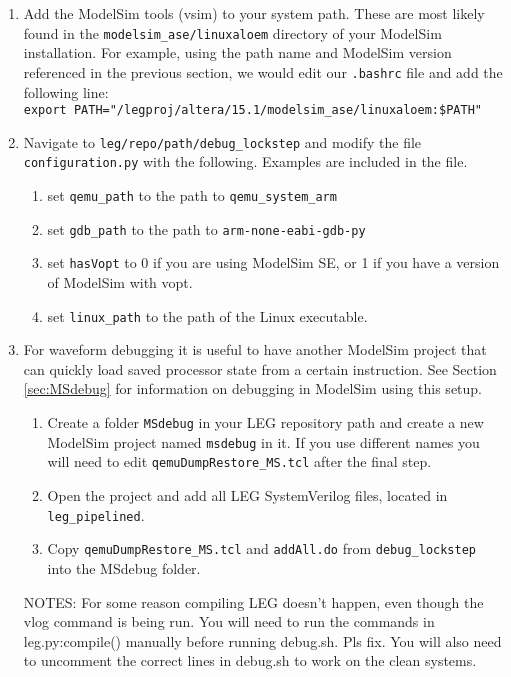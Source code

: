 \begin{enumerate}
\item Add the ModelSim tools (vsim) to your system path.
These are most likely found in the \texttt{modelsim\_ase/linuxaloem} directory of your ModelSim installation.
For example, using the path name and ModelSim version referenced in the previous section, we would edit our \texttt{.bashrc} file and add the following line: \\\texttt{export PATH="/legproj/altera/15.1/modelsim\_ase/linuxaloem:\$PATH"}

\item Navigate to \texttt{leg/repo/path/debug\_lockstep} and modify the file \texttt{config\-uration.py} with the following. 
Examples are included in the file.
	\begin{enumerate}
		\item set \texttt{qemu\_path} to the path to \texttt{qemu\_system\_arm}
		\item set \texttt{gdb\_path} to the path to \texttt{arm-none-eabi-gdb-py}
		\item set \texttt{hasVopt} to 0 if you are using ModelSim SE, or 1 if you have a version of ModelSim with vopt.
		\item set \texttt{linux\_path} to the path of the Linux executable.
	\end{enumerate}
	
\item For waveform debugging it is useful to have another ModelSim project that can quickly load saved processor state from a certain instruction.
See Section \ref{sec:MSdebug} for information on debugging in ModelSim using this setup.
	\begin{enumerate}
		\item Create a folder \texttt{MSdebug} in your LEG repository path and create a new ModelSim project named \texttt{msdebug} in it.
		If you use different names you will need to edit \texttt{qemuDumpRestore\_MS.tcl} after the final step.
		\item Open the project and add all LEG SystemVerilog files, located in \texttt{leg\_pipelined}.
		\item Copy \texttt{qemuDumpRestore\_MS.tcl} and \texttt{addAll.do} from \texttt{debug\_lockstep} into the MSdebug folder.
	\end{enumerate}



NOTES: For some reason compiling LEG doesn't happen, even though the vlog command is being run. 
You will need to run the commands in leg.py:compile() manually before running debug.sh.
Pls fix.
You will also need to uncomment the correct lines in debug.sh to work on the clean systems. 
\end{enumerate}









